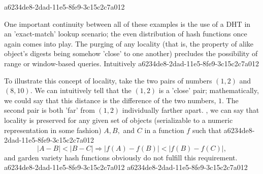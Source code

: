 \documentclass[12pt]{article}
\begin{document}
a6234de8-2dad-11e5-8fe9-3c15c2c7a012\par One important continuity between all of these examples is the use of a DHT in an 'exact-match' lookup scenario; the even distribution of hash functions once again comes into play. The purging of any locality (that is, the property of alike object's digests being somehow 'close' to one another) precludes the possibility of range or window-based queries. Intuitively
a6234de8-2dad-11e5-8fe9-3c15c2c7a012
\par To illustrate this concept of locality, take the two pairs of numbers $(1,2)$ and $(8,10)$. We can intuitively tell that the $(1,2)$ is a 'close' pair; mathematically, we could say that this distance is the difference of the two numbers, $1$. The second pair is both 'far' from $(1,2)$ individually farther apart. , we can say that locality is preserved for any given set of objects (serializable to a numeric representation in some fashion) $A,B,$ and $C$ in a function $f$ such that
a6234de8-2dad-11e5-8fe9-3c15c2c7a012\begin{equation}
|A-B| < |B-C| \Rightarrow |f(A)-f(B)| < |f(B) - f(C)|,
\end{equation}
and garden variety hash functions obviously do not fulfill this requirement.
a6234de8-2dad-11e5-8fe9-3c15c2c7a012
\printbibliography
a6234de8-2dad-11e5-8fe9-3c15c2c7a012
\end{document}
